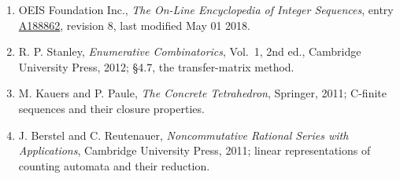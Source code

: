 \documentclass[11pt]{article}
\theoremstyle{definition}
\begin{document}
\begin{enumerate}

\item OEIS Foundation Inc., \emph{The On-Line Encyclopedia of Integer Sequences}, entry \href{https://oeis.org/A188862}{A188862}, revision 8, last modified May 01 2018.

\item R. P. Stanley, \emph{Enumerative Combinatorics}, Vol.~1, 2nd ed., Cambridge University Press, 2012; \S4.7, the transfer-matrix method.

\item M. Kauers and P. Paule, \emph{The Concrete Tetrahedron}, Springer, 2011; C-finite sequences and their closure properties.

\item J. Berstel and C. Reutenauer, \emph{Noncommutative Rational Series with Applications}, Cambridge University Press, 2011; linear representations of counting automata and their reduction.

\end{enumerate}
\end{document}
